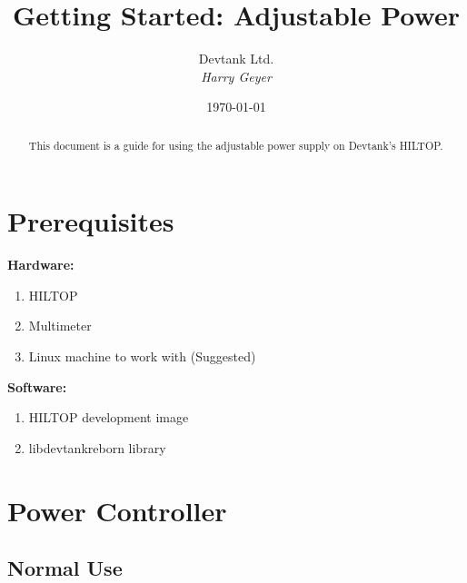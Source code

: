 \documentclass[a4paper,12pt, notitlepage]{article}
\begin{document}
\title{\textbf{\large{Getting Started: Adjustable Power}}}

\author{\normalsize{Devtank Ltd.} \\
        \small\textit{
        Harry Geyer}}
\date{\today}

\maketitle 
\thispagestyle{fancy}


\begin{abstract} 
\noindent
This document is a guide for using the adjustable power supply on Devtank's HILTOP.
\end{abstract}
\vspace{11mm}

\newpage
\tableofcontents
\newpage

\section{Prerequisites}
\label{sec: prereq}

\textbf{Hardware:}

\begin{enumerate}
  \item HILTOP
  \item Multimeter
  \item Linux machine to work with (Suggested)
\end{enumerate}

\noindent
\textbf{Software:}

\begin{enumerate}
  \item HILTOP development image
  \item libdevtankreborn library
\end{enumerate}

\newpage
\section{Power Controller}
\label{sec: Pwrctl}

\subsection{Normal Use}
\label{ssec: normalPwrctl}
\end{document}
